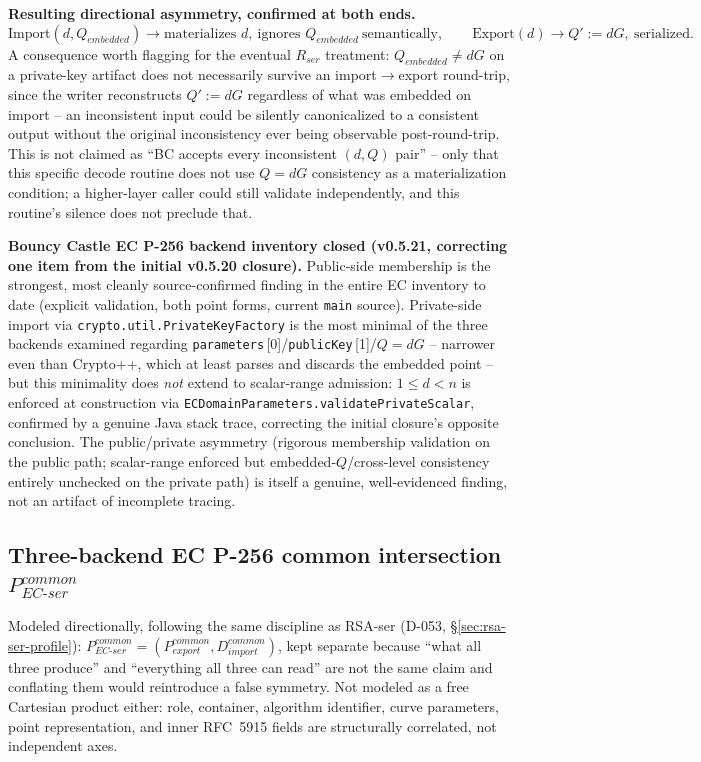 \documentclass[11pt,a4paper]{article}
\begin{document}
\textbf{Resulting directional asymmetry, confirmed at both ends.}
\[
\text{Import}(d, Q_{embedded}) \longrightarrow \text{materializes } d,\ \text{ignores } Q_{embedded}\ \text{semantically}, \qquad \text{Export}(d) \longrightarrow Q':=dG,\ \text{serialized}.
\]
A consequence worth flagging for the eventual $R_{ser}$ treatment: $Q_{embedded}\neq dG$ on a private-key artifact does not necessarily survive an import$\to$export round-trip, since the writer reconstructs $Q':=dG$ regardless of what was embedded on import -- an inconsistent input could be silently canonicalized to a consistent output without the original inconsistency ever being observable post-round-trip. This is not claimed as ``BC accepts every inconsistent $(d,Q)$ pair'' -- only that this specific decode routine does not use $Q=dG$ consistency as a materialization condition; a higher-layer caller could still validate independently, and this routine's silence does not preclude that.

\textbf{Bouncy Castle EC P-256 backend inventory closed (v0.5.21, correcting one item from the initial v0.5.20 closure).} Public-side membership is the strongest, most cleanly source-confirmed finding in the entire EC inventory to date (explicit validation, both point forms, current \texttt{main} source). Private-side import via \texttt{crypto.util.PrivateKeyFactory} is the most minimal of the three backends examined regarding \texttt{parameters}\,[0]/\texttt{publicKey}\,[1]/$Q=dG$ -- narrower even than Crypto++, which at least parses and discards the embedded point -- but this minimality does \emph{not} extend to scalar-range admission: $1\le d<n$ is enforced at construction via \texttt{ECDomainParameters.validatePrivateScalar}, confirmed by a genuine Java stack trace, correcting the initial closure's opposite conclusion. The public/private asymmetry (rigorous membership validation on the public path; scalar-range enforced but embedded-$Q$/cross-level consistency entirely unchecked on the private path) is itself a genuine, well-evidenced finding, not an artifact of incomplete tracing.

\subsection{Three-backend EC P-256 common intersection \texorpdfstring{$P_{EC\text{-}ser}^{common}$}{P EC-ser common}}\label{sec:ec-ser-common}

Modeled directionally, following the same discipline as RSA-ser (D-053, \S\ref{sec:rsa-ser-profile}): $P_{EC\text{-}ser}^{common} = (P_{export}^{common}, D_{import}^{common})$, kept separate because ``what all three produce'' and ``everything all three can read'' are not the same claim and conflating them would reintroduce a false symmetry. Not modeled as a free Cartesian product either: role, container, algorithm identifier, curve parameters, point representation, and inner RFC~5915 fields are structurally correlated, not independent axes.
\end{document}
